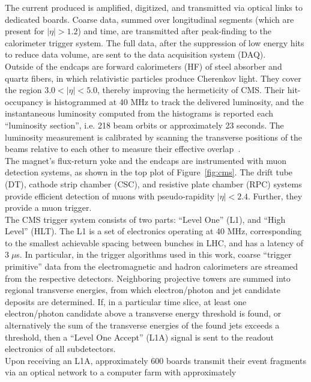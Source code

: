 The current produced is amplified, digitized, and transmitted via optical links to 
dedicated boards. Coarse data, summed over longitudinal segments (which are present 
for $|\eta| > 1.2$) and time, are transmitted after peak-finding to the calorimeter 
trigger system. The full data, after the suppression of low energy hits to reduce data 
volume, are sent to the data acquisition system (DAQ).\\
\indent Outside of the endcaps are forward 
calorimeters (HF) of steel absorber and quartz fibers, in which relativistic particles 
produce Cherenkov light. They cover the region $3.0 < |\eta| < 5.0$, thereby improving the 
hermeticity of CMS. Their hit-occupancy is histogrammed at 40 MHz to track the delivered
luminosity, and the instantaneous luminosity computed from the histograms is reported each
``luminosity section'', i.e. 218 beam orbits or approximately 23 seconds. The luminosity 
measurement is calibrated by scanning the transverse positions of the beams relative to each 
other to measure their effective overlap~\cite{CMS-PAS-SMP-12-008}.\\ 
\indent The magnet’s flux-return yoke and the endcaps are instrumented with muon detection systems, 
as shown in the top plot of Figure~\ref{fig:cms}. The drift tube (DT), cathode strip chamber 
(CSC), and resistive plate chamber (RPC) systems provide
efficient detection of muons with pseudo-rapidity $|\eta| < 2.4$. Further, they provide a
muon trigger. \\
\indent The CMS trigger system consists of two parts: ``Level One'' (L1), and ``High
Level'' (HLT). The L1 is a set of electronics operating at 40 MHz, corresponding to
the smallest achievable spacing between bunches in LHC, and has a latency of $3\; \mu$s. In
particular, in the trigger algorithms used in this work, coarse ``trigger primitive'' data
from the electromagnetic and hadron calorimeters are streamed from the respective
detectors. Neighboring projective towers are summed into regional transverse energies, 
from which electron/photon and jet candidate deposits are determined. If, in
a particular time slice, at least one electron/photon candidate above a transverse
energy threshold is found, or alternatively the sum of the transverse energies of the
found jets exceeds a threshold, then a ``Level One Accept'' (L1A) signal is sent to the
readout electronics of all subdetectors. \\
\indent Upon receiving an L1A, approximately 600 boards 
transmit their event fragments via an optical network to a computer farm with approximately 
